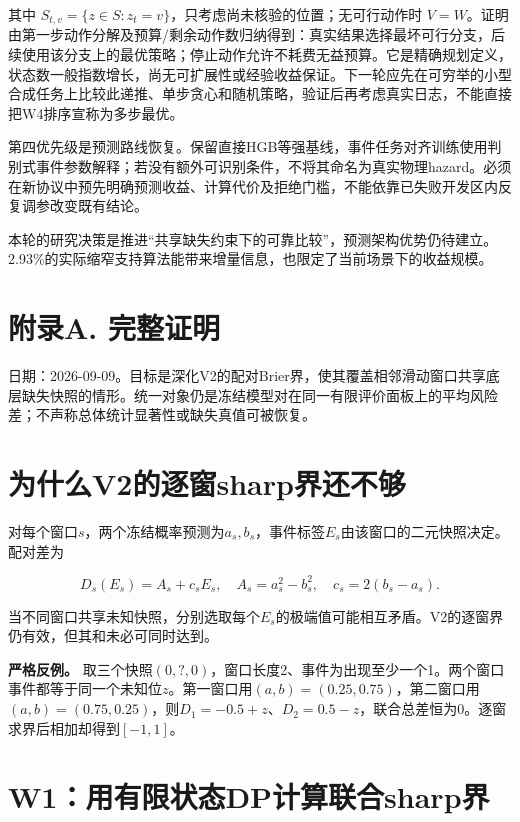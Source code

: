 \documentclass[UTF8,11pt,a4paper,fontset=windows]{ctexart}
\begin{document}
其中 $S_{t,v}=\{z\in S:z_t=v\}$，只考虑尚未核验的位置；无可行动作时 $V=W$。证明由第一步动作分解及预算/剩余动作数归纳得到：真实结果选择最坏可行分支，后续使用该分支上的最优策略；停止动作允许不耗费无益预算。它是精确规划定义，状态数一般指数增长，尚无可扩展性或经验收益保证。下一轮应先在可穷举的小型合成任务上比较此递推、单步贪心和随机策略，验证后再考虑真实日志，不能直接把W4排序宣称为多步最优。


第四优先级是预测路线恢复。保留直接HGB等强基线，事件任务对齐训练使用判别式事件参数解释；若没有额外可识别条件，不将其命名为真实物理hazard。必须在新协议中预先明确预测收益、计算代价及拒绝门槛，不能依靠已失败开发区内反复调参改变既有结论。


本轮的研究决策是推进“共享缺失约束下的可靠比较”，预测架构优势仍待建立。2.93\%的实际缩窄支持算法能带来增量信息，也限定了当前场景下的收益规模。


\clearpage\setcounter{subsection}{0}\section*{附录A. 完整证明}

日期：2026-09-09。目标是深化V2的配对Brier界，使其覆盖相邻滑动窗口共享底层缺失快照的情形。统一对象仍是冻结模型对在同一有限评价面板上的平均风险差；不声称总体统计显著性或缺失真值可被恢复。


\section{为什么V2的逐窗sharp界还不够}

对每个窗口$s$，两个冻结概率预测为$a_s,b_s$，事件标签$E_s$由该窗口的二元快照决定。配对差为


\begin{equation}
D_s(E_s)=A_s+c_sE_s,\quad A_s=a_s^2-b_s^2,\quad c_s=2(b_s-a_s).\tag{P1}
\end{equation}

当不同窗口共享未知快照，分别选取每个$E_s$的极端值可能相互矛盾。V2的逐窗界仍有效，但其和未必可同时达到。


\textbf{严格反例。} 取三个快照$(0,?,0)$，窗口长度2、事件为出现至少一个1。两个窗口事件都等于同一个未知位$z$。第一窗口用$(a,b)=(0.25,0.75)$，第二窗口用$(a,b)=(0.75,0.25)$，则$D_1=-0.5+z$、$D_2=0.5-z$，联合总差恒为0。逐窗求界后相加却得到$[-1,1]$。


\section{W1：用有限状态DP计算联合sharp界}
\end{document}
